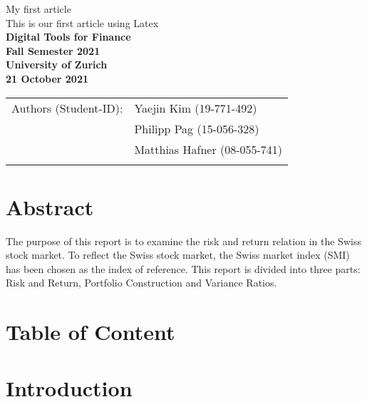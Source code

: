 \documentclass{article}
\begin{document}
\vspace*{3cm}

\begin{center}

\thispagestyle{empty}

{\Huge My first article}\\[0.5cm]
{\LARGE This is our first article using Latex}\\[1.5cm]

{\Large \bf Digital Tools for Finance}\\[1cm]

{\bf \large Fall Semester 2021\\
University of Zurich}\\[1cm]

{\large \bf 21 October 2021}\\[3cm]


\begin{tabular}{ll}
\hline
{Authors (Student-ID):} & { Yaejin Kim (19-771-492)}\\
& { Philipp Pag (15-056-328)}\\
& { Matthias Hafner (08-055-741) }\\
\hline \\
\end{tabular}



\end{center}


\newpage


\section*{Abstract}
 
The purpose of this report is to examine the risk and return relation in the Swiss stock market. To reflect the Swiss stock market, the Swiss market index (SMI) has been chosen as the index of reference. This report is divided into three parts: Risk and Return, Portfolio Construction and Variance Ratios.

\newpage

\section{Table of Content}
\newpage

\section{Introduction}
\blindtext
\newpage
\end{document}
